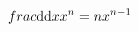\documentclass[preview]{standalone}
\begin{document}
\begin{align*}
{\Huge } \ f rac{\mathrm{d}}{\mathrm{d}x}x^n=nx^{n-1}
\end{align*}
\end{document}
